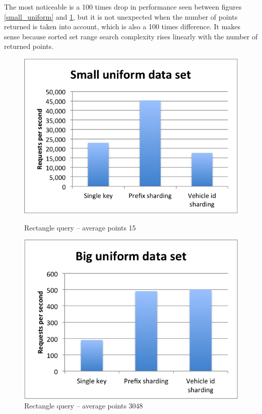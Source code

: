 \documentclass[times, utf8, diplomski]{fer}
\begin{document}
The most noticeable is a 100 times drop in performance seen between figures \ref{small_uniform} and \ref{big_uniform}, but it is not unexpected when the number of points returned is taken into account, which is also a 100 times difference. It makes sense because sorted set range search complexity rises linearly with the number of returned points.

\begin{figure}[h]
\includegraphics[width=\textwidth]{rectangle_small_uniform}
\caption{Rectangle query -- average points 15}
\label{small_uniform}
\endminipage\hfill
{}
\includegraphics[width=\textwidth]{rectangle_big_uniform}
\caption{Rectangle query -- average points 3048}
\label{big_uniform}
\endminipage\hfill
\end{figure}
\end{document}
